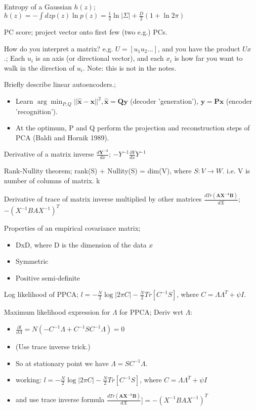 \documentclass{article}
\begin{document}
Entropy of a Gaussian $h(z)$; $h(z)=-\int dz p(z) \ln p(z) = \frac{1}{2}\ln|\Sigma|+\frac{D}{2}(1+\ln 2\pi )$

PC score; project vector onto first few (two e.g.) PCs.

How do you interpret a matrix? e.g. $U = [u_1 u_2 ...]$, and you have the product $Ux$.; Each $u_i$ is an axis (or directional vector), and each $x_i$ is how far you want to walk in the direction of $u_i$. \newline Note: this is not in the notes.

Briefly describe linear autoencoders.; \begin{itemize} \item Learn $\arg\min_{P,Q}||\hat{\mathbf{x}}-\mathbf{x}||^2, \mathbf{\hat{x}=Qy}$ (decoder 'generation'), $\mathbf{y=Px}$ (encoder 'recognition').  \item At the optimum, P and Q perform the projection and reconstruction steps of PCA (Baldi and Hornik 1989).  \end{itemize}

Derivative of a matrix inverse $\frac{d\mathbf{Y^{-1}}}{dx}$; $-Y^{-1}\frac{\partial{Y}}{dx}Y^{-1}$

Rank-Nullity theorem; rank(S) + Nullity(S) = dim(V), where $S:V\to W$. i.e. V is number of columns of matrix. k

Derivative of trace of matrix inverse multiplied by other matrices $\frac{d Tr \mathbf{(AX^{-1}B)}}{dX}$; $-(X^{-1}BAX^{-1})^T$

Properties of an empirical covariance matrix; \begin{itemize} \item DxD, where D is the dimension of the data $x$ \item Symmetric \item Positive semi-definite \end{itemize}

Log likelihood of PPCA; $l = -\frac{N}{2}\log|2\pi C|-\frac{N}{2}Tr[C^{-1}S]$, where $C=\Lambda\Lambda^T+\psi I$.

Maximum likelihood expression for $\Lambda$ for PPCA; Deriv wrt $\Lambda$: \begin{itemize} \item $\frac{\partial l}{\partial \Lambda} = N(-C^{-1}\Lambda+C^{-1}SC^{-1}\Lambda) = 0$ \item (Use trace inverse trick.) \item So at stationary point we have $\Lambda = SC^{-1}\Lambda$.  \item working: $l = -\frac{N}{2}\log|2\pi C|-\frac{N}{2}Tr[C^{-1}S]$, where $C=\Lambda\Lambda^T+\psi I$ \item and use trace inverse formula $\frac{d Tr \mathbf{(AX^{-1}B)}}{dX}] = -(X^{-1}BAX^{-1})^T$ \end{itemize}
\end{document}
